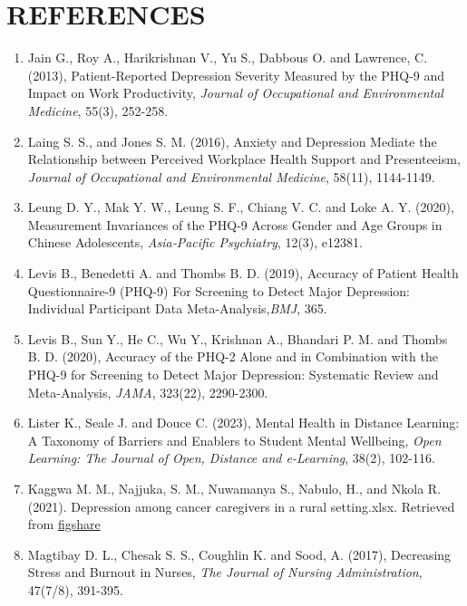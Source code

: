 \documentclass[11pt]{article}\usepackage[]{graphicx}\usepackage[]{xcolor}
\numberwithin{equation}{section}
\numberwithin{table}{section}
\begin{document}
\newpage
\section*{REFERENCES}
\begin{enumerate}
	\item Jain G., Roy A., Harikrishnan V., Yu S., Dabbous O. and Lawrence, C. (2013), Patient-Reported Depression Severity Measured by the PHQ-9 and Impact on Work Productivity, \emph{Journal of Occupational and Environmental Medicine}, 55(3), 252-258.
	
	\item Laing S. S., and Jones S. M. (2016), Anxiety and Depression Mediate the Relationship between Perceived Workplace Health Support and Presenteeism, \emph{Journal of Occupational and Environmental Medicine}, 58(11), 1144-1149.
	
	\item Leung D. Y., Mak Y. W., Leung S. F., Chiang V. C. and Loke A. Y. (2020), Measurement Invariances of the PHQ‐9 Across Gender and Age Groups in Chinese Adolescents,\emph{ Asia‐Pacific Psychiatry}, 12(3), e12381.
	
	\item Levis B., Benedetti A. and Thombs B. D. (2019), Accuracy of Patient Health Questionnaire-9 (PHQ-9) For Screening to Detect Major Depression: Individual Participant Data Meta-Analysis,\emph{BMJ}, 365.
	
	\item Levis B., Sun Y., He C., Wu Y., Krishnan A., Bhandari P. M. and Thombs B. D. (2020), Accuracy of the PHQ-2 Alone and in Combination with the PHQ-9 for Screening to Detect Major Depression: Systematic Review and Meta-Analysis,\emph{ JAMA}, 323(22), 2290-2300.
	
	\item Lister K., Seale J. and Douce C. (2023), Mental Health in Distance Learning: A Taxonomy of Barriers and Enablers to Student Mental Wellbeing, \emph{Open Learning: The Journal of Open, Distance and e-Learning}, 38(2), 102-116.
	\item Kaggwa M. M., Najjuka, S. M., Nuwamanya S., Nabulo, H., and Nkola R. (2021). Depression among cancer caregivers in a rural setting.xlsx. Retrieved from
	\href{https://figshare.com/articles/dataset/Depressionamongcancercaregiversinaruralsettingxlsx/doi: 10.6084/m9.figshare.14524800.v1}{figshare}
	
	\item Magtibay D. L., Chesak S. S., Coughlin K. and Sood, A. (2017), Decreasing Stress and Burnout in Nurses, \emph{The Journal of Nursing Administration}, 47(7/8), 391-395.
	

\end{enumerate}
\end{document}
